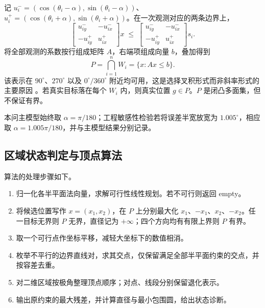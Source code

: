 \documentclass[UTF8,a4paper,zihao=-4,fontset=none]{ctexart}
\begin{document}
记 \(u_i^-=(\cos(\theta_i-\alpha),\sin(\theta_i-\alpha))\)、\(u_i^+=(\cos(\theta_i+\alpha),\sin(\theta_i+\alpha))\)。在一次观测对应的两条边界上，
\begin{equation}
  \begin{bmatrix}u_{iy}^- & -u_{ix}^-\\[2pt] -u_{iy}^+ & u_{ix}^+\end{bmatrix}x
  \;\le\;
  \begin{bmatrix}u_{iy}^- & -u_{ix}^-\\[2pt] -u_{iy}^+ & u_{ix}^+\end{bmatrix}s_i .
  \label{eq:halfplane}
\end{equation}
将全部观测的系数按行组成矩阵 \(A\)，右端项组成向量 \(b\)，叠加得到
\begin{equation}
  P=\bigcap_{i=1}^{n}W_i=\{x:Ax\le b\}.
  \label{eq:P}
\end{equation}
该表示在 \(90^\circ\)、\(270^\circ\) 以及 \(0^\circ/360^\circ\) 附近均可用，这是选择叉积形式而非斜率形式的主要原因 \cite{Tokekar2013}。若真实目标落在每个 \(W_i\) 内，则真实位置 \(g\in P\)。\(P\) 是闭凸多面集，但不保证有界。

本问主模型始终取 \(\alpha=\pi/180\)；工程敏感性检验若将误差半宽放宽为 \(1.005^\circ\)，相应取 \(\alpha=1.005\pi/180\)，并与主模型结果分别记录。

\subsection{区域状态判定与顶点算法}

算法的处理步骤如下。

\begin{enumerate}[label=(\arabic*),leftmargin=2.2em]
  \item 归一化各半平面法向量，求解可行性线性规划。若不可行则返回 empty。
  \item 将候选位置写作 \(x=(x_1,x_2)\)，在 \(P\) 上分别最大化 \(x_1\)、\(-x_1\)、\(x_2\)、\(-x_2\)。任一目标无界则 \(P\) 无界，直径记为 \(+\infty\)；四个方向均有有限上界则 \(P\) 有界。
  \item 取一个可行点作坐标平移，减轻大坐标下的数值相消。
  \item 枚举不平行的边界直线对，求其交点，仅保留满足全部半平面约束的交点，并按容差去重。
  \item 对二维区域按极角整理顶点顺序；对点、线段分别保留退化表示。
  \item 输出原约束的最大残差，并计算直径与最小包围圆，给出状态诊断。
\end{enumerate}
\end{document}
